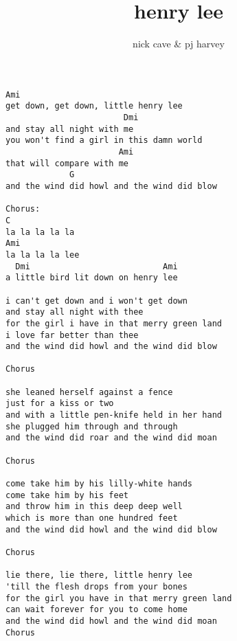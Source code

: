 \author{nick cave \& pj harvey}
\title{henry lee}
\maketitle
\begin{verbatim}
Ami
get down, get down, little henry lee
                        Dmi
and stay all night with me
you won't find a girl in this damn world
                       Ami
that will compare with me
             G
and the wind did howl and the wind did blow

Chorus:
C
la la la la la
Ami
la la la la lee
  Dmi                           Ami
a little bird lit down on henry lee

i can't get down and i won't get down
and stay all night with thee
for the girl i have in that merry green land
i love far better than thee
and the wind did howl and the wind did blow

Chorus

she leaned herself against a fence
just for a kiss or two
and with a little pen-knife held in her hand
she plugged him through and through
and the wind did roar and the wind did moan

Chorus

come take him by his lilly-white hands
come take him by his feet
and throw him in this deep deep well
which is more than one hundred feet
and the wind did howl and the wind did blow

Chorus

lie there, lie there, little henry lee
'till the flesh drops from your bones
for the girl you have in that merry green land
can wait forever for you to come home
and the wind did howl and the wind did moan
Chorus
\end{verbatim}